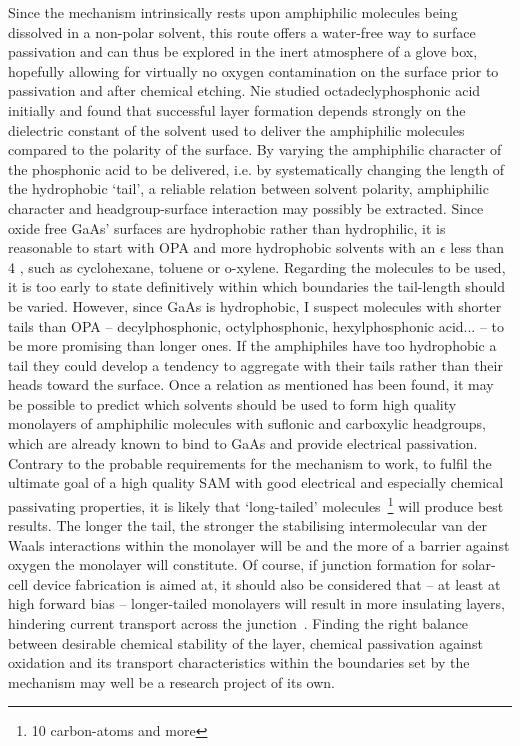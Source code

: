 \documentclass[a4paper]{article}
\begin{document}
Since  the mechanism intrinsically rests upon amphiphilic molecules being dissolved in a non-polar solvent, this route offers a water-free way to surface passivation and can thus be explored in the inert atmosphere of a glove box, hopefully allowing for virtually no oxygen contamination on the surface prior to passivation and after chemical etching. Nie studied octadeclyphosphonic acid initially and found that successful layer formation depends strongly on the dielectric constant of the solvent used to deliver the amphiphilic molecules compared to the polarity of the surface. By varying the amphiphilic character of the phosphonic acid to be delivered, i.e. by systematically changing the length of the hydrophobic `tail', a reliable relation between solvent polarity, amphiphilic character and headgroup-surface interaction may possibly be extracted. Since oxide free GaAs' surfaces are hydrophobic rather than hydrophilic, it is reasonable to start with OPA and more hydrophobic solvents with an $\epsilon$ less than 4 , such as cyclohexane, toluene or o-xylene. Regarding the molecules to be used, it is too early to state definitively within which boundaries the tail-length should be varied. However, since GaAs is hydrophobic, I suspect molecules with shorter tails than OPA -- decylphosphonic, octylphosphonic, hexylphosphonic acid... -- to be more promising than longer ones. If the amphiphiles have too hydrophobic a tail they could develop a tendency to aggregate with their tails rather than their heads toward the surface. Once a relation as mentioned has been found, it may be possible to predict which solvents should be used to form high quality monolayers of amphiphilic molecules with suflonic and carboxylic headgroups, which are already known to bind to GaAs and provide electrical passivation. Contrary to the probable requirements for the mechanism to work, to fulfil the ultimate goal of a high quality SAM with good electrical and especially chemical passivating properties, it is likely that `long-tailed' molecules~\footnote{10 carbon-atoms and more} will produce best results. The longer the tail, the stronger the stabilising intermolecular van der Waals interactions within the monolayer will be and the more of a barrier against oxygen the monolayer will constitute. Of course, if junction formation for solar-cell device fabrication is aimed at, it should also be considered that -- at least at high forward bias -- longer-tailed monolayers will result in more insulating layers, hindering current transport across the junction~\cite{alkyltransport}. Finding the right balance between desirable chemical stability of the layer, chemical passivation against oxidation and its transport characteristics within the boundaries set by the mechanism may well be a research project of its own.
\end{document}
